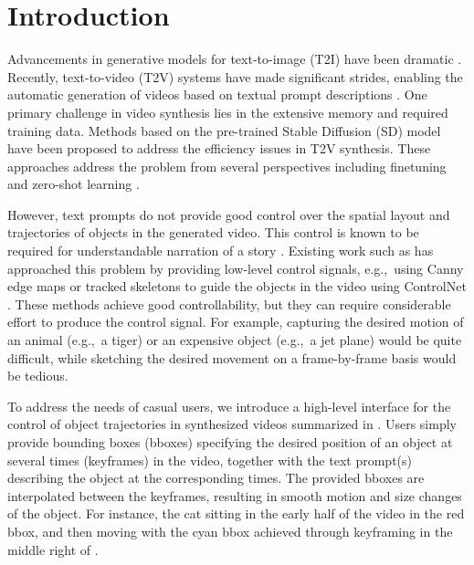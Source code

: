 \section{Introduction}
\label{sec:intro}

Advancements in generative models for text-to-image (T2I) have been dramatic \cite{DALLE2,IMAGEN,RombachStablediffusion21,ediffI}. Recently, text-to-video (T2V) systems have made significant strides, enabling the automatic generation of videos based on textual prompt descriptions \cite{Ho2022ImagenVH, ho2022video, wu2023tune, Esser2023StructureAC}. One primary challenge in video synthesis lies in the extensive memory and required training data. Methods based on the pre-trained Stable Diffusion (SD) model have been proposed to address the efficiency issues in T2V synthesis. These approaches address the problem from several perspectives including finetuning  and zero-shot learning \cite{text2video-zero, qi2023fatezero}.

However, text prompts do not provide good control over the spatial layout and trajectories of objects in the generated video. This control is known to be required for understandable narration of a story \cite{FilmGrammar}. Existing work such as \cite{hu2023videocontrolnet} has approached this problem by providing low-level control signals, e.g.,~using Canny edge maps or tracked skeletons to guide the objects in the video using ControlNet \cite{controlnet}. These methods achieve good controllability, but they can require considerable effort to produce the control signal. For example, capturing the desired motion of an animal (e.g.,~a tiger) or an expensive object (e.g.,~a jet plane) would be quite difficult, while sketching the desired movement on a frame-by-frame basis would be tedious.


To address the needs of casual users, we introduce a high-level interface for the control of object trajectories in synthesized videos summarized in . Users simply provide bounding boxes (bboxes) specifying the desired position of an object at several times (keyframes) in the video, together with the text prompt(s) describing the object at the corresponding times. The provided bboxes are interpolated between the keyframes, resulting in smooth motion and size changes of the object. For instance, the cat sitting in the early half of the video in the red bbox, and then moving with the cyan bbox achieved through keyframing in the middle right of .

